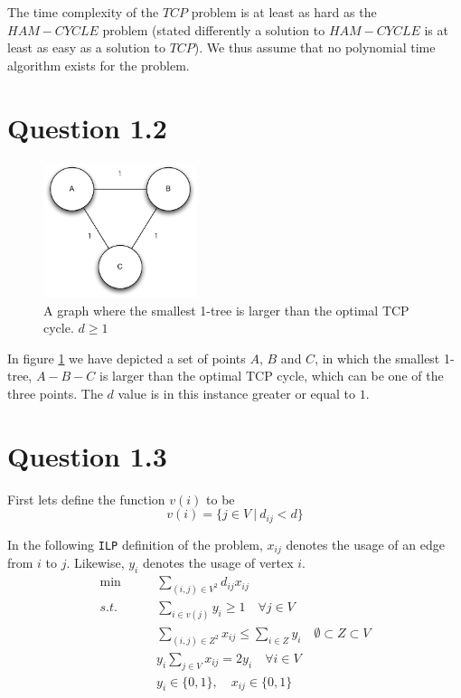 \documentclass[10pt]{article}
\begin{document}
The time complexity of the $TCP$ problem is at least as hard as the $HAM-CYCLE$ problem (stated differently a solution to $HAM-CYCLE$ is at least as easy as a solution to $TCP$). We thus assume that no polynomial time algorithm exists for the problem.


\section*{Question 1.2} %
\label{sec:question_1_2}

\begin{figure}
	\centering
	\includegraphics[width=0.4\textwidth]{figures/unicycle.pdf}
	\caption{A graph where the smallest 1-tree is larger than the optimal TCP cycle. $d \geq 1$}
	\label{unicycle}
\end{figure}
In figure \ref{unicycle} we have depicted a set of points $A$, $B$ and $C$, in which the smallest 1-tree, $A-B-C$ is larger than the optimal TCP cycle, which can be one of the three points.
The $d$ value is in this instance greater or equal to $1$.

\section*{Question 1.3} %
\label{sec:question_1_3}
First lets define the function $v(i)$ to be
\begin{equation}
   v(i) = \{ j \in V\ |\ d_{ij} < d \}
\end{equation}

In the following \texttt{ILP} definition of the problem, $x_{ij}$ denotes the usage of an edge from $i$ to $j$.
Likewise, $y_i$ denotes the usage of vertex $i$.
\begin{align}
\min &\qquad \sum_{(i,j) \in V^2} d_{ij} x_{ij} \nonumber\\
s.t. &\qquad \sum_{i \in v(j)} y_i \geq 1 \quad \forall j \in V \nonumber\\
	 &\qquad \sum_{(i,j) \in Z^2} x_{ij} \leq \sum_{i \in Z} y_i \quad \emptyset \subset Z \subset V \nonumber\\
	 &\qquad y_i \sum_{j \in V } x_{ij} = 2 y_i \quad \forall i \in V \nonumber\\
	 &\qquad y_i \in \{0,1\}, \quad x_{ij} \in \{0,1\} \nonumber
\end{align}
\end{document}
